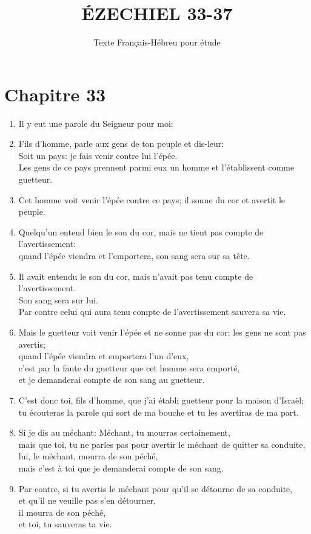 \documentclass[12pt,a4paper,titlepage]{article}
\title{\vspace{5cm} \huge ÉZECHIEL 33-37}
\date{Texte Français-Hébreu pour étude}
\def \pslabelsep{0.2em} %
\def \psleftmargin{0em} %
\begin{document}
\maketitle
\vfill
\thispagestyle{empty}
\newpage 

\noindent
\section*{Chapitre 33}
\begin{enumerate}[leftmargin=\psleftmargin, labelsep = \pslabelsep, label={\arabic*}, font=\color{\pscolor}\small\textsuperscript, parsep=0em, itemsep=0em, topsep=0em ]
\item Il y eut une parole du Seigneur pour moi:
\item Fils d’homme, parle aux gens de ton peuple et dis-leur: \\ Soit un pays: je fais venir contre lui l’épée.\\ Les gens de ce pays prennent parmi eux un homme et l’établissent comme guetteur.
\item Cet homme voit venir l’épée contre ce pays; il sonne du cor et avertit le peuple.
\item Quelqu’un entend bien le son du cor, mais ne tient pas compte de l’avertissement: \\ quand l’épée viendra et l’emportera, son sang sera sur sa tête. 
\item Il avait entendu le son du cor, mais n’avait pas tenu compte de l’avertissement. \\ Son sang sera sur lui. \\ Par contre celui qui aura tenu compte de l’avertissement sauvera sa vie. 
\item Mais le guetteur voit venir l’épée et ne sonne pas du cor: les gens ne sont pas avertis; \\ quand l’épée viendra et emportera l’un d’eux, \\ c’est par la faute du guetteur que cet homme sera emporté, 
\\ et je demanderai compte de son sang au guetteur. \parSpace

\item C’est donc toi, fils d’homme, que j’ai établi guetteur pour la maison d’Israël;\\ tu écouteras la parole qui sort de ma bouche et tu les avertiras de ma part.
\item Si je dis au méchant: \og{}Méchant, tu mourras certainement\fg{},\\ mais que toi, tu ne parles pas pour avertir le méchant de quitter sa conduite, \\ lui, le méchant, mourra de son péché, \\ mais c’est à toi que je demanderai compte de son sang. 
\item Par contre, si tu avertis le méchant pour qu’il se détourne de sa conduite, \\ et qu’il ne veuille pas s’en détourner, \\ il mourra de son péché, \\ et toi, tu sauveras ta vie. \parSpace


\end{enumerate}
\end{document}
